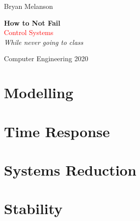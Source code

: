 \documentclass[11pt]{article}
\newcommand*{\plogo}{\fbox{$\mathcal{BM}$}}
\begin{document}
 
        
    \begin{titlepage}
    
        \raggedleft
        
        \vspace*{\baselineskip}
        
        {\Large Bryan Melanson}
        
        \vspace*{0.167\textheight}
        
        \textbf{\LARGE How to Not Fail}\\[\baselineskip]
        
        {\textcolor{Red}{\Huge Control Systems}}\\[\baselineskip]
        
        {\Large \textit{While never going to class}}
        
        \vfill
        
        {\large Computer Engineering 2020 ~~\plogo}
        
        \vspace*{3\baselineskip}
    
    \end{titlepage}

    \pagebreak
    

    \tableofcontents

    
    \section{Modelling}
    

    \section{Time Response}
    
    
    \section{Systems Reduction}


    \section{Stability}
\end{document}
